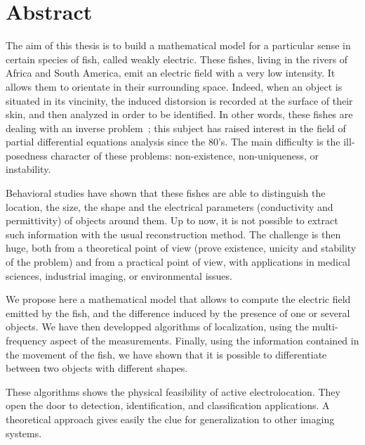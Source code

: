 \chapter*{Abstract}

The aim of this thesis is to build a mathematical model for a particular
sense in certain species of fish, called weakly electric. These fishes,
living in the rivers of Africa and South America, emit an electric field with
a very low intensity. It allows them to orientate in their surrounding space.
Indeed, when an object is situated in its vincinity, the induced distorsion is
recorded at the surface of their skin, and then analyzed in order to be identified.
In other words, these fishes are dealing with an inverse problem~; this subject
has raised interest in the field of partial differential equations analysis
since the $80$'s. The main difficulty is the ill-posedness character of these
problems: non-existence, non-uniqueness, or instability.

Behavioral studies have shown that these fishes are able to distinguish the
location, the size, the shape and the electrical parameters (conductivity and
permittivity) of objects around them. Up to now, it is not possible to extract
such information with the usual reconstruction method. The challenge is then
huge, both from a theoretical point of view (prove existence, unicity and
stability of the problem) and from a practical point of view, with applications
in medical sciences, industrial imaging, or environmental issues.

We propose here a mathematical model that allows to compute the electric field
emitted by the fish, and the difference induced by the presence of one or several
objects. We have then developped algorithms of localization, using the multi-frequency
aspect of the measurements. Finally, using the information contained in the 
movement of the fish, we have shown that it is possible to differentiate between
two objects with different shapes.

These algorithms shows the physical feasibility of active electrolocation. They
open the door to detection, identification, and classification applications. A
theoretical approach gives easily the clue for generalization to other imaging
systems. 